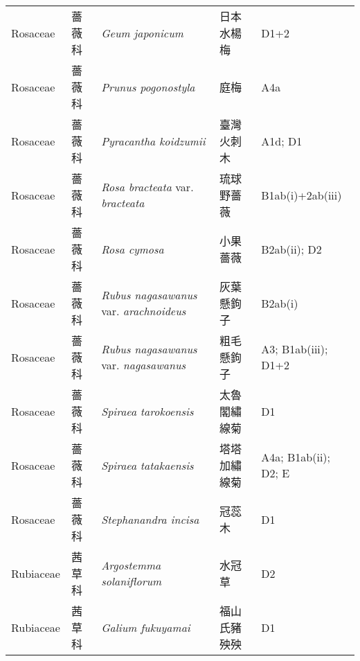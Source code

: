 {\begin{longtable}{p{2.5cm}p{2.5cm}p{4.5cm}p{2.5cm}p{3cm}}
    Rosaceae & 薔薇科 & \textit{Geum japonicum}  & 日本水楊梅 & D1+2 \index{Geum@\textit{Geum}!japonicum@\textit{japonicum}}  \index{日本水楊梅} \\
    Rosaceae & 薔薇科 & \textit{Prunus pogonostyla}  & 庭梅 & A4a \index{Prunus@\textit{Prunus}!pogonostyla@\textit{pogonostyla}}  \index{庭梅} \\
    Rosaceae & 薔薇科 & \textit{Pyracantha koidzumii}  & 臺灣火刺木 & A1d; D1 \index{Pyracantha@\textit{Pyracantha}!koidzumii@\textit{koidzumii}}  \index{臺灣火刺木} \\
    Rosaceae & 薔薇科 & \textit{Rosa bracteata} var. \textit{bracteata}  & 琉球野薔薇 & B1ab(i)+2ab(iii) \index{Rosa@\textit{Rosa}!bracteata@\textit{bracteata}!var. bracteata@var. \textit{bracteata}}  \index{琉球野薔薇} \\
    Rosaceae & 薔薇科 & \textit{Rosa cymosa}  & 小果薔薇 & B2ab(ii); D2 \index{Rosa@\textit{Rosa}!cymosa@\textit{cymosa}}  \index{小果薔薇} \\
    Rosaceae & 薔薇科 & \textit{Rubus nagasawanus} var. \textit{arachnoideus}  & 灰葉懸鉤子 & B2ab(i) \index{Rubus@\textit{Rubus}!nagasawanus@\textit{nagasawanus}!var. arachnoideus@var. \textit{arachnoideus}}  \index{灰葉懸鉤子} \\
    Rosaceae & 薔薇科 & \textit{Rubus nagasawanus} var. \textit{nagasawanus}  & 粗毛懸鉤子 & A3; B1ab(iii); D1+2 \index{Rubus@\textit{Rubus}!nagasawanus@\textit{nagasawanus}!var. nagasawanus@var. \textit{nagasawanus}}  \index{粗毛懸鉤子} \\
    Rosaceae & 薔薇科 & \textit{Spiraea tarokoensis}  & 太魯閣繡線菊 & D1 \index{Spiraea@\textit{Spiraea}!tarokoensis@\textit{tarokoensis}}  \index{太魯閣繡線菊} \\
    Rosaceae & 薔薇科 & \textit{Spiraea tatakaensis}  & 塔塔加繡線菊 & A4a; B1ab(ii); D2; E \index{Spiraea@\textit{Spiraea}!tatakaensis@\textit{tatakaensis}}  \index{塔塔加繡線菊} \\
    Rosaceae & 薔薇科 & \textit{Stephanandra incisa}  & 冠蕊木 & D1 \index{Stephanandra@\textit{Stephanandra}!incisa@\textit{incisa}}  \index{冠蕊木} \\
    Rubiaceae & 茜草科 & \textit{Argostemma solaniflorum}  & 水冠草 & D2 \index{Argostemma@\textit{Argostemma}!solaniflorum@\textit{solaniflorum}}  \index{水冠草} \\
    Rubiaceae & 茜草科 & \textit{Galium fukuyamai}  & 福山氏豬殃殃 & D1 \index{Galium@\textit{Galium}!fukuyamai@\textit{fukuyamai}}  \index{福山氏豬殃殃} \\

\end{longtable}}
